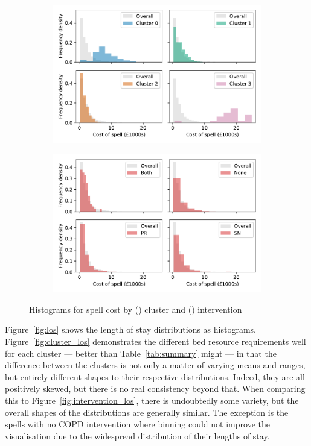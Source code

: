 \begin{figure}
    \centering
    \begin{subfigure}{\imgwidth}
        \includegraphics[width=\linewidth]{cluster_spell_cost}
        \caption{}\label{fig:cluster_cost}
    \end{subfigure}

    \begin{subfigure}{\imgwidth}
        \includegraphics[width=\linewidth]{intervention_spell_cost}
        \caption{}\label{fig:intervention_cost}
    \end{subfigure}
    \caption{%
        Histograms for spell cost by () cluster and
        () intervention
    }\label{fig:cost}
\end{figure}

Figure~\ref{fig:los} shows the length of stay distributions as histograms.
Figure~\ref{fig:cluster_los} demonstrates the different bed resource
requirements well for each cluster --- better than Table~\ref{tab:summary} might
--- in that the difference between the clusters is not only a matter of varying
means and ranges, but entirely different shapes to their respective
distributions. Indeed, they are all positively skewed, but there is no real
consistency beyond that. When comparing this to
Figure~\ref{fig:intervention_los}, there is undoubtedly some variety, but the
overall shapes of the distributions are generally similar. The exception is the
spells with no COPD intervention where binning could not improve the
visualisation due to the widespread distribution of their lengths of stay.

